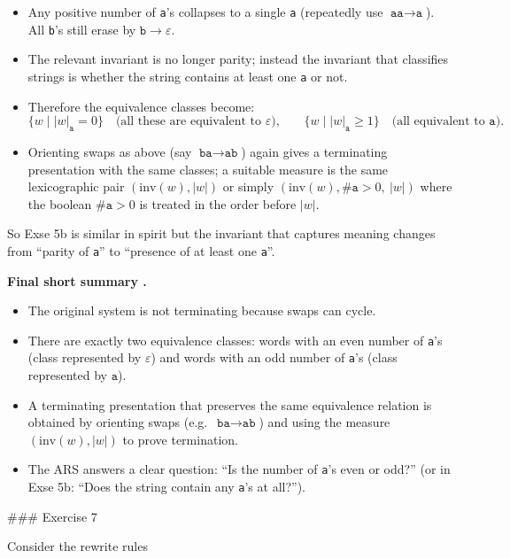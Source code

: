 \documentclass[12pt]{article}
\begin{document}
\begin{itemize}
  \item Any positive number of \texttt{a}'s collapses to a single \texttt{a} (repeatedly use \(\texttt{aa}\to\texttt{a}\)). All \texttt{b}'s still erase by \(\texttt{b}\to\varepsilon\).
  \item The relevant invariant is no longer parity; instead the invariant that classifies strings is whether the string contains at least one \texttt{a} or not.
  \item Therefore the equivalence classes become:
    \[
      \{w\mid |w|_{\texttt{a}}=0\}\quad\text{(all these are equivalent to }\varepsilon\text{),}
      \qquad
      \{w\mid |w|_{\texttt{a}}\ge 1\}\quad\text{(all equivalent to }\texttt{a}\text{).}
    \]
  \item Orienting swaps as above (say \(\texttt{ba}\to\texttt{ab}\)) again gives a terminating presentation with the same classes; a suitable measure is the same lexicographic pair \((\mathrm{inv}(w),|w|)\) or simply \((\mathrm{inv}(w),\#\texttt{a}>0,\ |w|)\) where the boolean \(\#\texttt{a}>0\) is treated in the order before \(|w|\).
\end{itemize}

So Exse 5b is similar in spirit but the invariant that captures meaning changes from ``parity of \texttt{a}'' to ``presence of at least one \texttt{a}''.

\bigskip

\textbf{Final short summary .}
\begin{itemize}
  \item The original system is not terminating because swaps can cycle.
  \item There are exactly two equivalence classes: words with an even number of \texttt{a}'s (class represented by \(\varepsilon\)) and words with an odd number of \texttt{a}'s (class represented by \(\texttt{a}\)).
  \item A terminating presentation that preserves the same equivalence relation is obtained by orienting swaps (e.g.\ \(\texttt{ba}\to\texttt{ab}\)) and using the measure \((\mathrm{inv}(w),|w|)\) to prove termination.
  \item The ARS answers a clear question: ``Is the number of \texttt{a}'s even or odd?'' (or in Exse 5b: ``Does the string contain any \texttt{a}'s at all?'').
\end{itemize}

### Exercise 7

Consider the rewrite rules
\end{document}
